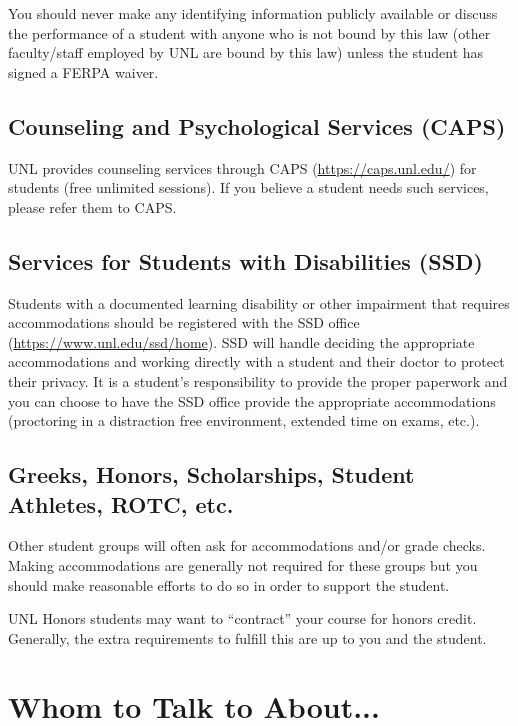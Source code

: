 \documentclass[12pt]{scrartcl}
\begin{document}
You should never make any identifying information publicly available
or discuss the performance of a student with anyone who is 
not bound by this law (other faculty/staff employed by UNL are
bound by this law) unless the student has signed a FERPA waiver.

\subsection{Counseling and Psychological Services (CAPS)}

UNL provides counseling services through CAPS 
(\url{https://caps.unl.edu/}) for students (free unlimited 
sessions).  If you believe a student needs such services, please
refer them to CAPS.

\subsection{Services for Students with Disabilities (SSD)}

Students with a documented learning disability or other impairment
that requires accommodations should be registered with the 
SSD office (\url{https://www.unl.edu/ssd/home}).  SSD will handle
deciding the appropriate accommodations and working directly
with a student and their doctor to protect their privacy.  
It is a student's responsibility to provide the proper paperwork
and you can choose to have the SSD office provide the appropriate
accommodations (proctoring in a distraction free environment, 
extended time on exams, etc.).

\subsection{Greeks, Honors, Scholarships, Student Athletes, ROTC, etc.}

Other student groups will often ask for accommodations and/or
grade checks.  Making accommodations are generally not required
for these groups but you should make reasonable efforts to do so
in order to support the student.  

UNL Honors students may want to ``contract'' your course for honors
credit.  Generally, the extra requirements to fulfill this are up
to you and the student.


\section{Whom to Talk to About...}
\end{document}
